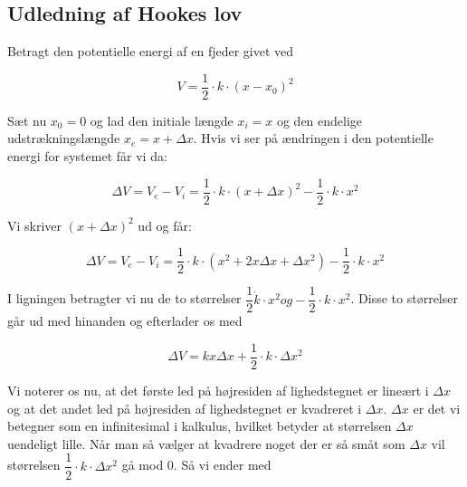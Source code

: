 \subsection{Udledning af Hookes lov}\label{Hookes}
Betragt den potentielle energi af en fjeder givet ved

\bigskip

\begin{equation}
V=\dfrac{1}{2} \cdot k \cdot (x-x_{0})^2
\end{equation}

\bigskip

Sæt nu $x_0 = 0$ og lad den initiale længde $x_i = x$ og den endelige udstrækningslængde $x_e = x + \Delta x$. Hvis vi ser på ændringen i den potentielle energi for systemet får vi da:

\bigskip

\begin{equation}
\Delta V = V_e - V_i = \dfrac{1}{2} \cdot k \cdot (x+ \Delta x)^2 - \dfrac{1}{2} \cdot k \cdot x^2
\end{equation}

\bigskip

Vi skriver $(x + \Delta x)^2$ ud og får:

\bigskip

\begin{equation}
\Delta V = V_e - V_i = \dfrac{1}{2} \cdot k \cdot (x^2 + 2x \Delta x + \Delta x^2) - \dfrac{1}{2} \cdot k \cdot x^2 
\end{equation}

\bigskip

I ligningen betragter vi nu de to størrelser $\dfrac{1}{2} \dot k \cdot x^2 og - \dfrac{1}{2} \cdot k \cdot x^2$. Disse to størrelser går ud med hinanden og efterlader os med

\bigskip

\begin{equation}
\Delta V = kx \Delta x + \dfrac{1}{2} \cdot k \cdot \Delta x^2
\end{equation}

Vi noterer os nu, at det første led på højresiden af lighedstegnet er lineært i $\Delta x$ og at det andet led på højresiden af lighedstegnet er kvadreret i $\Delta x$. $\Delta x$ er det vi betegner som en infinitesimal i kalkulus, hvilket betyder at størrelsen $\Delta x$ uendeligt lille. Når man så vælger at kvadrere noget der er så småt som $\Delta x$ vil størrelsen $\dfrac{1}{2} \cdot k \cdot \Delta x^2$ gå mod 0. Så vi ender med

\bigskip

